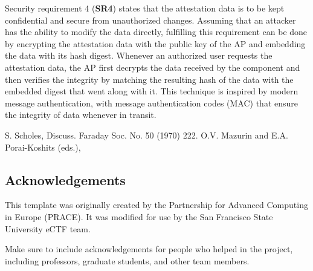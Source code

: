 \documentclass{prace}
\begin{document}
Security requirement 4 (\textbf{SR4}) states that the attestation data is to be kept confidential and secure from unauthorized changes.
 Assuming that an attacker has the ability to modify the data directly, fulfilling this requirement can be done by encrypting 
 the attestation data with the public key of the AP and embedding the data with its hash digest. Whenever an authorized user 
 requests the attestation data, the AP first decrypts the data received by the component and then verifies the integrity by 
 matching the resulting hash of the data with the embedded digest that went along with it. This technique is inspired by modern 
 message authentication, with message authentication codes (MAC) that ensure the integrity of data whenever in transit.

%

\begin{thebibliography}{99}
	S. Scholes, Discuss. Faraday Soc. No. 50 (1970) 222.
	O.V. Mazurin and E.A. Porai-Koshits (eds.),
\end{thebibliography}

\subsection*{Acknowledgements}
This template was originally created by the Partnership for Advanced Computing
in Europe (PRACE). It was modified for use by the San Francisco State University
eCTF team.

Make sure to include acknowledgements for people who helped in the project,
including professors, graduate students, and other team members.

\end{document}
